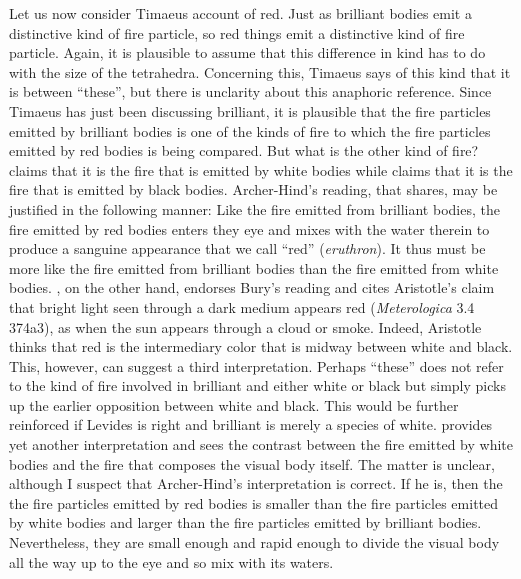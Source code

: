 Let us now consider Timaeus account of red. Just as brilliant bodies emit a distinctive kind of fire particle, so red things emit a distinctive kind of fire particle. Again, it is plausible to assume that this difference in kind has to do with the size of the tetrahedra. Concerning this, Timaeus says of this kind that it is between ``these'', but there is unclarity about this anaphoric reference. Since Timaeus has just been discussing brilliant, it is plausible that the fire particles emitted by brilliant bodies is one of the kinds of fire to which the fire particles emitted by red bodies is being compared. But what is the other kind of fire? \citet[250 n8]{Archer-Hind:1888qd} claims that it is the fire that is emitted by white bodies while \citet[67 n3]{Bury:1929jb} claims that it is the fire that is emitted by black bodies. Archer-Hind's reading, that \citet[168]{Brisson:1997qr} shares, may be justified in the following manner: Like the fire emitted from brilliant bodies, the fire emitted by red bodies enters they eye and mixes with the water therein to produce a sanguine appearance that we call ``red'' (\emph{eruthron}). It thus must be more like the fire emitted from brilliant bodies than the fire emitted from white bodies. \citet[277 n2]{Cornford:1935fk}, on the other hand, endorses Bury's reading and cites Aristotle's claim that bright light seen through a dark medium appears red (\emph{Meterologica} 3.4 374a3), as when the sun appears through a cloud or smoke. Indeed, Aristotle thinks that red is the intermediary color that is midway between white and black. This, however, can suggest a third interpretation. Perhaps ``these'' does not refer to the kind of fire involved in brilliant and either white or black but simply picks up the earlier opposition between white and black. This would be further reinforced if Levides is right and brilliant is merely a species of white. \citet[482]{Taylor:1928qb} provides yet another interpretation and sees the contrast between the fire emitted by white bodies and the fire that composes the visual body itself. The matter is unclear, although I suspect that Archer-Hind's interpretation is correct. If he is, then the the fire particles emitted by red bodies is smaller than the fire particles emitted by white bodies and larger than the fire particles emitted by brilliant bodies. Nevertheless, they are small enough and rapid enough to divide the visual body all the way up to the eye and so mix with its waters.

